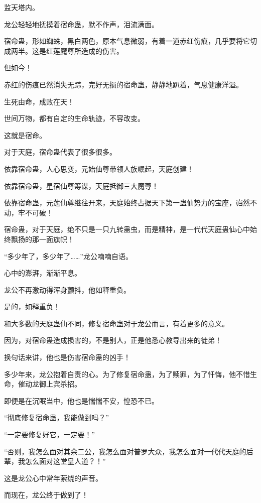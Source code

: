 
\begin{this_body}

监天塔内。

龙公轻轻地抚摸着宿命蛊，默不作声，泪流满面。

宿命蛊，形如蜘蛛，黑白两色，原本气息微弱，有着一道赤红伤痕，几乎要将它切成两半。这是红莲魔尊所造成的伤害。

但如今！

赤红的伤痕已然消失无踪，完好无损的宿命蛊，静静地趴着，气息健康洋溢。

生死由命，成败在天！

世间万物，都有自定的生命轨迹，不容改变。

这就是宿命。

对于天庭，宿命蛊代表了很多很多。

依靠宿命蛊，人心思变，元始仙尊带领人族崛起，天庭创建！

依靠宿命蛊，星宿仙尊筹谋，天庭抵御三大魔尊！

依靠宿命蛊，元莲仙尊继往开来，天庭始终占据天下第一蛊仙势力的宝座，岿然不动，牢不可破！

宿命蛊，对于天庭，绝不只是一只九转蛊虫，而是精神，是一代代天庭蛊仙心中始终飘扬的那一面旗帜！

“多少年了，多少年了……”龙公喃喃自语。

心中的澎湃，渐渐平息。

龙公不再激动得浑身颤抖，他如释重负。

是的，如释重负！

和大多数的天庭蛊仙不同，修复宿命蛊对于龙公而言，有着更多的意义。

因为，对宿命蛊造成损害的，不是别人，正是他悉心教导出来的徒弟！

换句话来讲，他也是伤害宿命蛊的凶手！

多少年来，龙公抱着自责的心。为了修复宿命蛊，为了赎罪，为了忏悔，他不惜生命，催动龙御上宾杀招。

即便是在沉眠当中，他也是惴惴不安，惶恐不已。

“彻底修复宿命蛊，我能做到吗？”

“一定要修复好它，一定要！”

“否则，我怎么面对其余二公，我怎么面对普罗大众，我怎么面对一代代天庭的后辈，我怎么面对这堂皇人道？！”

这是龙公心中常年萦绕的声音。

而现在，龙公终于做到了！


\end{this_body}
